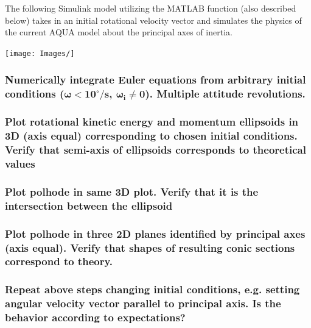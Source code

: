 The following Simulink model utilizing the MATLAB function (also described below) takes in an initial rotational velocity vector and simulates the physics of the current AQUA model about the principal axes of inertia.

\texttt{[image: Images/]}


\subsubsection{Numerically integrate Euler equations from arbitrary initial conditions ($\boldsymbol{\omega < 10^{\circ}/s}$, $\boldsymbol{\omega_i \neq 0}$). Multiple attitude revolutions.}

\subsubsection{Plot rotational kinetic energy and momentum ellipsoids in 3D (axis equal) corresponding to chosen initial conditions. Verify that semi-axis of ellipsoids corresponds to theoretical values}

\subsubsection{Plot polhode in same 3D plot. Verify that it is the intersection between the ellipsoid}

\subsubsection{Plot polhode in three 2D planes identified by principal axes (axis equal). Verify that shapes of resulting conic sections correspond to theory.}

\subsubsection{Repeat above steps changing initial conditions, e.g. setting angular velocity vector parallel to principal axis. Is the behavior according to expectations?}